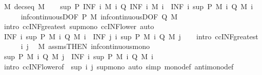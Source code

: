 \begin{isabellebody}
\ M{\isacharcolon}\ {\isachardoublequoteopen}decseq\ M{\isachardoublequoteclose}\isanewline
\ \ \isamarkupfalse%
\ {\isachardoublequoteopen}sup\ {\isacharparenleft}P\ {\isacharparenleft}INF\ i{\isachardot}\ M\ i{\isacharparenright}{\isacharparenright}\ {\isacharparenleft}Q\ {\isacharparenleft}INF\ i{\isachardot}\ M\ i{\isacharparenright}{\isacharparenright}\ {\isasymle}\ {\isacharparenleft}INF\ i{\isachardot}\ sup\ {\isacharparenleft}P\ {\isacharparenleft}M\ i{\isacharparenright}{\isacharparenright}\ {\isacharparenleft}Q\ {\isacharparenleft}M\ i{\isacharparenright}{\isacharparenright}{\isacharparenright}{\isachardoublequoteclose}\isanewline
\ \ \ \ \isamarkupfalse%
\ inf{\isacharunderscore}continuousD{\isacharbrackleft}OF\ P\ M{\isacharbrackright}\ inf{\isacharunderscore}continuousD{\isacharbrackleft}OF\ Q\ M{\isacharbrackright}\ \isamarkupfalse%
\ {\isacharparenleft}intro\ ccINF{\isacharunderscore}greatest\ sup{\isacharunderscore}mono\ ccINF{\isacharunderscore}lower{\isacharparenright}\ auto\isanewline
\isanewline
\ \ \isamarkupfalse%
\ {\isachardoublequoteopen}{\isacharparenleft}INF\ i{\isachardot}\ sup\ {\isacharparenleft}P\ {\isacharparenleft}M\ i{\isacharparenright}{\isacharparenright}\ {\isacharparenleft}Q\ {\isacharparenleft}M\ i{\isacharparenright}{\isacharparenright}{\isacharparenright}\ {\isasymle}\ {\isacharparenleft}INF\ j\ i{\isachardot}\ sup\ {\isacharparenleft}P\ {\isacharparenleft}M\ i{\isacharparenright}{\isacharparenright}\ {\isacharparenleft}Q\ {\isacharparenleft}M\ j{\isacharparenright}{\isacharparenright}{\isacharparenright}{\isachardoublequoteclose}\isanewline
\ \ \isamarkupfalse%
\ {\isacharparenleft}intro\ ccINF{\isacharunderscore}greatest{\isacharparenright}\isanewline
\ \ \ \ \isamarkupfalse%
\ i\ j\ \isamarkupfalse%
\ M\ assms{\isacharbrackleft}THEN\ inf{\isacharunderscore}continuous{\isacharunderscore}mono{\isacharbrackright}\ \isamarkupfalse%
\ {\isachardoublequoteopen}sup\ {\isacharparenleft}P\ {\isacharparenleft}M\ i{\isacharparenright}{\isacharparenright}\ {\isacharparenleft}Q\ {\isacharparenleft}M\ j{\isacharparenright}{\isacharparenright}\ {\isasymge}\ {\isacharparenleft}INF\ i{\isachardot}\ sup\ {\isacharparenleft}P\ {\isacharparenleft}M\ i{\isacharparenright}{\isacharparenright}\ {\isacharparenleft}Q\ {\isacharparenleft}M\ i{\isacharparenright}{\isacharparenright}{\isacharparenright}{\isachardoublequoteclose}\isanewline
\ \ \ \ \ \ \isamarkupfalse%
\ {\isacharparenleft}intro\ ccINF{\isacharunderscore}lower{}{\isacharbrackleft}of\ {\isacharunderscore}\ {\isachardoublequoteopen}sup\ i\ j{\isachardoublequoteclose}{\isacharbrackright}\ sup{\isacharunderscore}mono{\isacharparenright}\ {\isacharparenleft}auto\ simp{\isacharcolon}\ mono{\isacharunderscore}def\ antimono{\isacharunderscore}def{\isacharparenright}\isanewline

\end{isabellebody}
